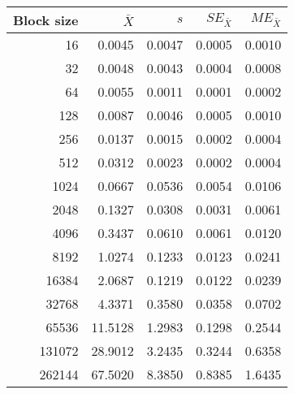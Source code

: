 \begin{tabular}{rrrrr}\toprule
{\small Block size} & $\bar{X}$ & $s$ & $SE_{\bar{X}}$ & $ME_{\bar{X}}$ \\\midrule
16 & 0.0045 & 0.0047 & 0.0005 & 0.0010\\
32 & 0.0048 & 0.0043 & 0.0004 & 0.0008\\
64 & 0.0055 & 0.0011 & 0.0001 & 0.0002\\
128 & 0.0087 & 0.0046 & 0.0005 & 0.0010\\
256 & 0.0137 & 0.0015 & 0.0002 & 0.0004\\
512 & 0.0312 & 0.0023 & 0.0002 & 0.0004\\
1024 & 0.0667 & 0.0536 & 0.0054 & 0.0106\\
2048 & 0.1327 & 0.0308 & 0.0031 & 0.0061\\
4096 & 0.3437 & 0.0610 & 0.0061 & 0.0120\\
8192 & 1.0274 & 0.1233 & 0.0123 & 0.0241\\
16384 & 2.0687 & 0.1219 & 0.0122 & 0.0239\\
32768 & 4.3371 & 0.3580 & 0.0358 & 0.0702\\
65536 & 11.5128 & 1.2983 & 0.1298 & 0.2544\\
131072 & 28.9012 & 3.2435 & 0.3244 & 0.6358\\
262144 & 67.5020 & 8.3850 & 0.8385 & 1.6435\\
\bottomrule
\end{tabular}
